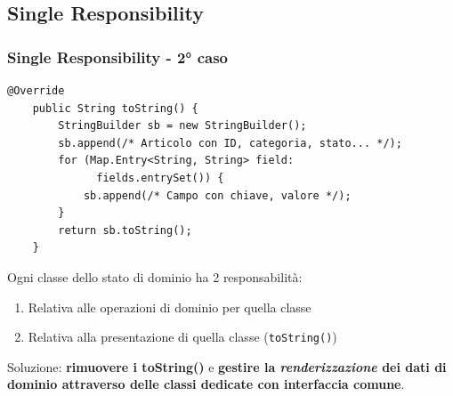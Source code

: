 \subsection{Single Responsibility}
\beamertitle


\begin{frame}[fragile]
    \frametitle{Single Responsibility - 2° caso}
    \begin{lstlisting}[autogobble, title={\texttt{toString()} di \texttt{Article.java}}]
    @Override
    public String toString() {
        StringBuilder sb = new StringBuilder();
        sb.append(/* Articolo con ID, categoria, stato... */);
        for (Map.Entry<String, String> field:
              fields.entrySet()) {
            sb.append(/* Campo con chiave, valore */);
        }
        return sb.toString();
    }
    \end{lstlisting}

    Ogni classe dello stato di dominio ha 2 responsabilità:
    \begin{enumerate}
        \item Relativa alle operazioni di dominio per quella classe
        \item Relativa alla presentazione di quella classe (\texttt{toString()})
    \end{enumerate}

    Soluzione: \textbf{rimuovere i toString()} e \textbf{gestire la \emph{renderizzazione} dei dati di dominio
    attraverso delle classi dedicate con interfaccia comune}.
\end{frame}

